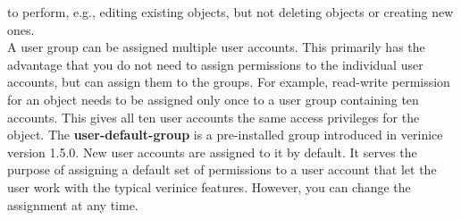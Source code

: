 \documentclass[a4paper,10pt]{book}
\begin{document}
to perform, e.g., editing existing objects, but not deleting objects or creating new ones.
\newline\\
A user group can be assigned multiple user accounts. This primarily has the advantage that you do not need to assign
permissions to the individual user accounts, but can assign them to the groups. For example, read-write permission
for an object needs to be assigned only once to a user group containing ten accounts. This gives all ten user
accounts the same access privileges for the object.
The \textbf{user-default-group} is a pre-installed group introduced in verinice version 1.5.0. New user
accounts are assigned to it by default. It serves the purpose of assigning a default set of permissions to a
user account that let the user work with the typical verinice features. However, you can change the assignment
at any time.
\end{document}
